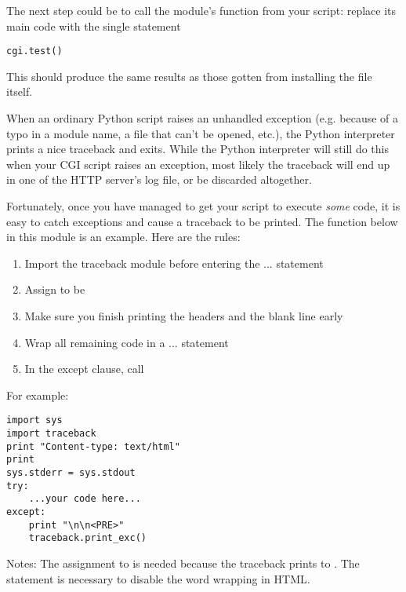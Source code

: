 The next step could be to call the  module's
 function from your script: replace its main code
with the single statement

\begin{verbatim}
cgi.test()
\end{verbatim}

This should produce the same results as those gotten from installing
the  file itself.

When an ordinary Python script raises an unhandled exception
(e.g. because of a typo in a module name, a file that can't be opened,
etc.), the Python interpreter prints a nice traceback and exits.
While the Python interpreter will still do this when your CGI script
raises an exception, most likely the traceback will end up in one of
the HTTP server's log file, or be discarded altogether.

Fortunately, once you have managed to get your script to execute
\emph{some} code, it is easy to catch exceptions and cause a traceback
to be printed.  The  function below in this module is
an example.  Here are the rules:

\begin{enumerate}
\item Import the traceback module before entering the 
   ...  statement

\item Assign  to be 

\item Make sure you finish printing the headers and the blank line
   early

\item Wrap all remaining code in a  ... 
   statement

\item In the except clause, call 
\end{enumerate}

For example:

\begin{verbatim}
import sys
import traceback
print "Content-type: text/html"
print
sys.stderr = sys.stdout
try:
    ...your code here...
except:
    print "\n\n<PRE>"
    traceback.print_exc()
\end{verbatim}

Notes: The assignment to  is needed because the
traceback prints to .
The  statement is necessary to
disable the word wrapping in HTML.

